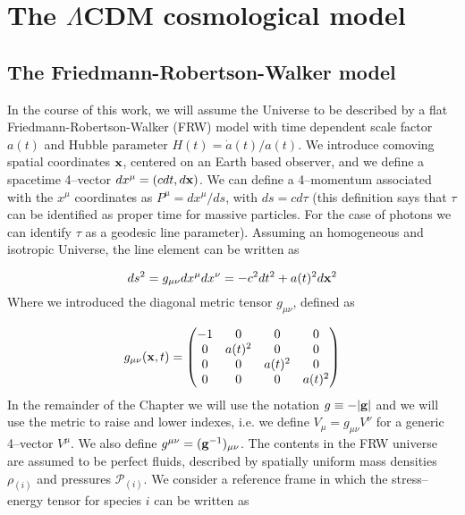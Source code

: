 
\chapter{The $\Lambda$CDM cosmological model}
\lhead[\fancyplain{}{\thepage}]{\fancyplain{}{\rightmark}}
 \thispagestyle{plain}
\setlength{\parindent}{10mm}
\label{chp:1}

\section{The Friedmann-Robertson-Walker model}
In the course of this work, we will assume the Universe to be described by a flat Friedmann-Robertson-Walker (FRW) model with time dependent scale factor $a(t)$ and Hubble parameter $H(t)=\dot{a}(t)/a(t)$. We introduce comoving spatial coordinates $\mathbf{x}$, centered on an Earth based observer, and we define a spacetime 4--vector $dx^{\mu}=(cdt,d\mathbf{x})$. We can define a 4--momentum associated with the $x^\mu$ coordinates as $P^\mu=dx^\mu/ds$, with $ds=cd\tau$ (this definition says that $\tau$ can be identified as proper time for massive particles. For the case of photons we can identify $\tau$ as a geodesic line parameter). Assuming an homogeneous and isotropic Universe, the line element can be written as  

\begin{equation}
\label{eq:1:frw}
ds^2 = g_{\mu\nu}dx^\mu dx^\nu = -c^2dt^2 + a(t)^2d\mathbf{x}^2
\end{equation}
%
Where we introduced the diagonal metric tensor $g_{\mu\nu}$, defined as 

\begin{equation}
\label{eq:1:metric}
g_{\mu\nu}(\mathbf{x},t) = 
\begin{pmatrix}
-1 & 0 & 0 & 0 \\
0 & a(t)^2 & 0 & 0 \\
0 & 0 & a(t)^2 & 0 \\
0 & 0 & 0 & a(t)^2 
\end{pmatrix}
\end{equation}
%
In the remainder of the Chapter we will use the notation $g\equiv-\vert\mathbf{g}\vert$ and we will use the metric to raise and lower indexes, i.e. we define $V_\mu = g_{\mu\nu}V^\nu$ for a generic 4--vector $V^\mu$. We also define $g^{\mu\nu}=(\mathbf{g}^{-1})_{\mu\nu}$.
The contents in the FRW universe are assumed to be perfect fluids, described by spatially uniform mass densities $\rho_{(i)}$ and pressures $\mathcal{P}_{(i)}$. We consider a reference frame in which the stress--energy tensor for species $i$ can be written as 

